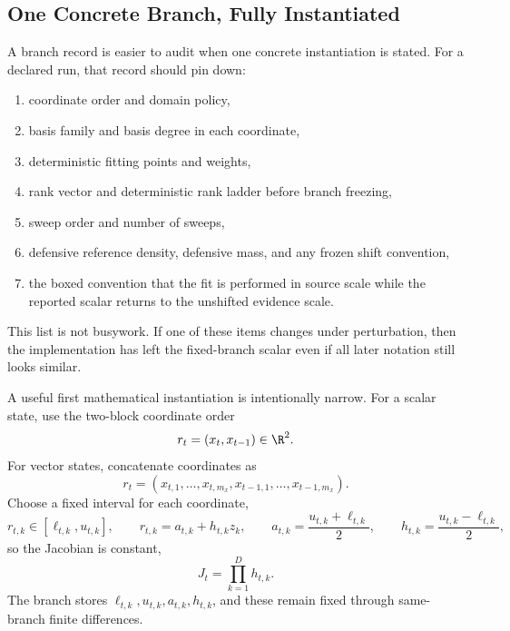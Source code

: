 \subsection{One Concrete Branch, Fully Instantiated}
\label{sec:bf-hd-squared-tt-concrete-branch}

A branch record is easier to audit when one concrete instantiation is stated.
For a declared run, that record should pin down:
\begin{enumerate}[leftmargin=0.28in]
  \item coordinate order and domain policy,
  \item basis family and basis degree in each coordinate,
  \item deterministic fitting points and weights,
  \item rank vector and deterministic rank ladder before branch freezing,
  \item sweep order and number of sweeps,
  \item defensive reference density, defensive mass, and any frozen shift
  convention,
  \item the boxed convention that the fit is performed in source scale while the
  reported scalar returns to the unshifted evidence scale.
\end{enumerate}
This list is not busywork.  If one of these items changes under perturbation,
then the implementation has left the fixed-branch scalar even if all later
notation still looks similar.

A useful first mathematical instantiation is intentionally narrow.  For a scalar
state, use the two-block coordinate order
\begin{equation}
  r_t=(x_t,x_{t-1})\in\R^2.
  \label{eq:bf-hd-squared-tt-concrete-order}
\end{equation}
For vector states, concatenate coordinates as
\begin{equation}
  r_t=(x_{t,1},\ldots,x_{t,m_x},x_{t-1,1},\ldots,x_{t-1,m_x}).
  \label{eq:bf-hd-squared-tt-concrete-vector-order}
\end{equation}
Choose a fixed interval for each coordinate,
\begin{equation}
  r_{t,k}\in[\ell_{t,k},u_{t,k}],
  \qquad
  r_{t,k}=a_{t,k}+h_{t,k}z_k,
  \qquad
  a_{t,k}=\frac{u_{t,k}+\ell_{t,k}}2,
  \qquad
  h_{t,k}=\frac{u_{t,k}-\ell_{t,k}}2,
  \label{eq:bf-hd-squared-tt-concrete-domain}
\end{equation}
so the Jacobian is constant,
\begin{equation}
  J_t=\prod_{k=1}^Dh_{t,k}.
  \label{eq:bf-hd-squared-tt-concrete-jacobian}
\end{equation}
The branch stores \(\ell_{t,k},u_{t,k},a_{t,k},h_{t,k}\), and these remain fixed
through same-branch finite differences.

